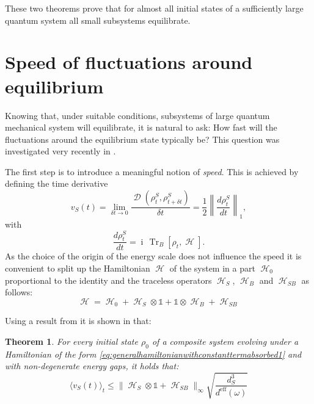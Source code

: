 \documentclass[aps,prl,twocolumn,showpacs,showkeys,a4paper]{revtex4}
\newtheorem{theorem}{Theorem}
\DeclareMathOperator{\Tr}{\mathrm{Tr}}%
\DeclareMathOperator{\tracedistance}{\mathcal{D}}
\DeclareMathOperator{\iu}{\mathrm{i}}%
\DeclareMathOperator{\haH}{\mathscr{H}}%
\newcommand{\expect}[1]{\langle #1\rangle}
\begin{document}
These two theorems prove that for almost all initial states of a sufficiently large quantum system all small subsystems equilibrate.


\section{Speed of fluctuations around equilibrium}
\label{sec:speedoffluctuationsaroudequilibrium}
%
Knowing that, under suitable conditions, subsystems of large quantum mechanical system will equilibrate, it is natural to ask: How fast will the fluctuations around the equilibrium state typically be?
This question was investigated very recently in \cite{0907.1267v1}.

The first step is to introduce a meaningful notion of \emph{speed}.
This is achieved by defining the time derivative \cite{0907.1267v1}
\begin{equation}
  v_S(t) = \lim_{\delta t \to 0} \frac{\tracedistance(\rho^S_t,\rho^S_{t+\delta t})}{\delta t} = \frac{1}{2} \left\| \frac{d\rho^S_t}{dt} \right\|_1 ,
\end{equation}
with
\begin{equation}
  \frac{d\rho^S_t}{dt} = \iu\,\Tr_B[\rho_t,\haH] .
\end{equation}
As the choice of the origin of the energy scale does not influence the speed it is convenient to split up the Hamiltonian $\haH$ of the system in a part $\haH_0$ proportional to the identity and the traceless operators $\haH_S$, $\haH_B$ and $\haH_{SB}$ as follows:
\begin{equation}
  \label{eq:generalhamiltonianwithconstanttermabsorbed1}
  \haH = \haH_0 + \haH_S \otimes \mathds{1} + \mathds{1} \otimes \haH_B + \haH_{SB}
\end{equation}

Using a result from \cite{Reimann08} it is shown in \cite{0907.1267v1} that:
\begin{theorem}
  \label{theorem:averagespeedisslow}
  {\bf \cite{0907.1267v1}}
  For every initial state $\rho_0$ of a composite system evolving under a Hamiltonian of the form \eqref{eq:generalhamiltonianwithconstanttermabsorbed1} and with non-degenerate energy gaps, it holds that:
  \begin{equation}
    \expect{v_S(t)}_t \leq \| \haH_S \otimes \mathds{1} + \haH_{SB}\|_\infty \sqrt{\frac{d_S^3}{d^{\mathrm{eff}}(\omega)}}
    \end{equation}
\end{theorem}
\end{document}

